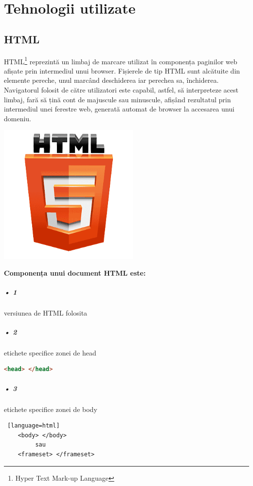\chapter{Tehnologii utilizate}
\section{HTML}

HTML\footnote{Hyper Text Mark-up Language} reprezintă un limbaj de marcare utilizat în componența paginilor web afișate prin intermediul unui browser. Fișierele de tip HTML sunt alcătuite din elemente pereche, unul marcând deschiderea iar perechea sa, închiderea.
Navigatorul folosit de către utilizatori este capabil, astfel, să interpreteze acest limbaj, fară să țină cont de majuscule sau minuscule, afișând rezultatul prin intermediul unei ferestre web, generată automat de browser la accesarea unui domeniu.
\begin{center}
\includegraphics[width=7cm]{./images/html-logo.png}\newline\newline\newline
\end{center}
\textbf{ Componența unui document HTML este:}\newline

\paragraph{• 1} versiunea de HTML folosita
\paragraph{• 2} etichete specifice zonei de head
\begin{lstlisting}[language=html]
	<head> </head>
\end{lstlisting}
\paragraph{• 3} etichete specifice zonei de body
\begin{lstlisting} [language=html]
	<body> </body>
	     sau 
    <frameset> </frameset>
\end{lstlisting}

